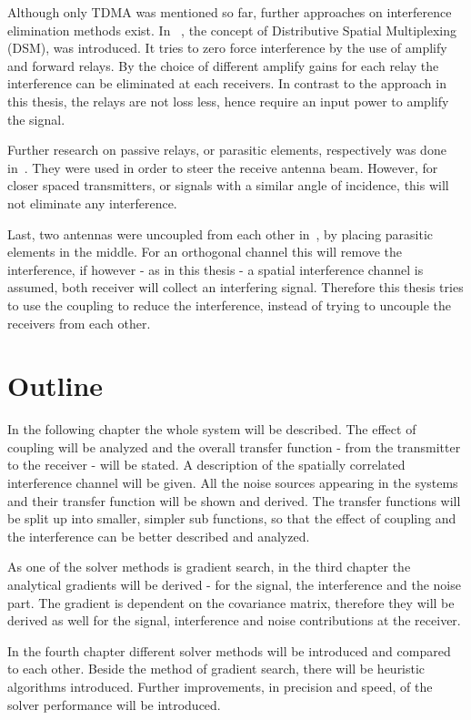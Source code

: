 Although only TDMA was mentioned so far, further approaches on interference elimination methods exist.
In ~\cite{Berger05}, the concept of Distributive Spatial Multiplexing (DSM), was introduced.
It tries to zero force interference by the use of amplify and forward relays.
By the choice of different amplify gains for each relay the interference can be eliminated at each receivers.
In contrast to the approach in this thesis, the relays are not loss less, hence require an input power to amplify the signal.

Further research on passive relays, or parasitic elements, respectively was done in~\cite{Bains08}.
They were used in order to steer the receive antenna beam.
However, for closer spaced transmitters, or signals with a similar angle of incidence, this will not eliminate any interference.

Last, two antennas were uncoupled from each other in~\cite{Lau12}, by placing parasitic elements in the middle.
For an orthogonal channel this will remove the interference, if however - as in this thesis - a spatial interference channel is assumed, both receiver will collect an interfering signal.
Therefore this thesis tries to use the coupling to reduce the interference, instead of trying to uncouple the receivers from each other.


\section{Outline}
\label{sec:outline}

In the following chapter the whole system will be described.
The effect of coupling will be analyzed and the overall transfer function - from the transmitter to the receiver - will be stated.
A description of the spatially correlated interference channel will be given.
All the noise sources appearing in the systems and their transfer function will be shown and derived.
The transfer functions will be split up into smaller, simpler sub functions, so that the effect of coupling and the interference can be better described and analyzed.

As one of the solver methods is gradient search, in the third chapter the analytical gradients will be derived - for the signal, the interference and the noise part.
The gradient is dependent on the covariance matrix, therefore they will be derived as well for the signal, interference and noise contributions at the receiver.

In the fourth chapter different solver methods will be introduced and compared to each other.
Beside the method of gradient search, there will be heuristic algorithms introduced.
Further improvements, in precision and speed, of the solver performance will be introduced.


